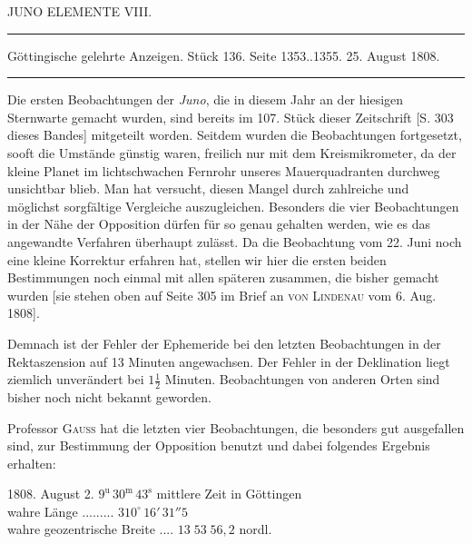 \begin{center}
JUNO ELEMENTE VIII.
\end{center}

\hrule
\begin{center}
\fontsize{10}{12}\selectfont Göttingische gelehrte Anzeigen. Stück 136. Seite 1353..1355. 25. August 1808.
\end{center}
\par\vspace{4pt}\hrule\vspace{4pt}

\par\indent Die ersten Beobachtungen der \emph{Juno}, die in diesem Jahr an der hiesigen Sternwarte gemacht wurden, sind bereits im 107. Stück dieser Zeitschrift [S. 303 dieses Bandes] mitgeteilt worden. Seitdem wurden die Beobachtungen fortgesetzt, sooft die Umstände günstig waren, freilich nur mit dem Kreismikrometer, da der kleine Planet im lichtschwachen Fernrohr unseres Mauerquadranten durchweg unsichtbar blieb. Man hat versucht, diesen Mangel durch zahlreiche und möglichst sorgfältige Vergleiche auszugleichen. Besonders die vier Beobachtungen in der Nähe der Opposition dürfen für so genau gehalten werden, wie es das angewandte Verfahren überhaupt zulässt. Da die Beobachtung vom 22. Juni noch eine kleine Korrektur erfahren hat, stellen wir hier die ersten beiden Bestimmungen noch einmal mit allen späteren zusammen, die bisher gemacht wurden [sie stehen oben auf Seite 305 im Brief an \textsc{von Lindenau} vom 6. Aug. 1808].

\par\indent Demnach ist der Fehler der Ephemeride bei den letzten Beobachtungen in der Rektaszension auf 13 Minuten angewachsen. Der Fehler in der Deklination liegt ziemlich unverändert bei $1\frac{1}{2}$ Minuten. Beobachtungen von anderen Orten sind bisher noch nicht bekannt geworden.

\par\indent Professor \textsc{Gauss} hat die letzten vier Beobachtungen, die besonders gut ausgefallen sind, zur Bestimmung der Opposition benutzt und dabei folgendes Ergebnis erhalten:

\begin{center}
1808. August 2. $9^{\text{u}}\,30^{\text{m}}\,43^{\text{s}}$ mittlere Zeit in Göttingen\\
wahre Länge .\;.\;.\;.\;.\;.\;.\;.\;.\; $310^\circ\,16'\,31''5$\\
wahre geozentrische Breite .\;.\;.\;.\; $13\;53\;56,2$ nordl.
\end{center}

